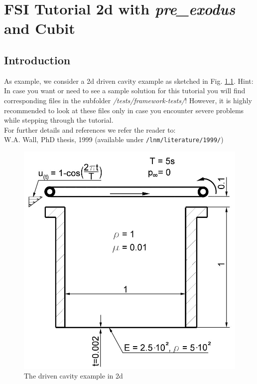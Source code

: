 \newcommand{\prexo}{\emph{pre\_exodus \,}}
\newcommand{\bc}{\emph{bc-file \,}}
\newcommand{\head}{\emph{header-file \,}}

\chapter{FSI Tutorial 2d with \prexo and Cubit}
\label{tut_fsi_preexo:chap}

\section{Introduction}

As example, we consider a 2d driven cavity example as
sketched in Fig. \ref{tut_fsi_preexo_2d:1.1}.
Hint: In case you want or need to see a sample solution for this tutorial 
you will find corresponding files in the \baci{} subfolder \emph{/tests/framework-tests/}!
However, it is highly recommended to look at these files only in case you encounter severe problems
while stepping through the tutorial.\\
For further details and references we refer the reader to:\\
W.A. Wall, PhD thesis, 1999
(available under \texttt{/lnm/literature/1999/})

\begin{figure}[h]
\hfil\includegraphics[scale=0.2]{Bilder/Angabeskizze}

\caption{\label{tut_fsi_preexo_2d:1.1} The driven cavity example in 2d}
\end{figure}


